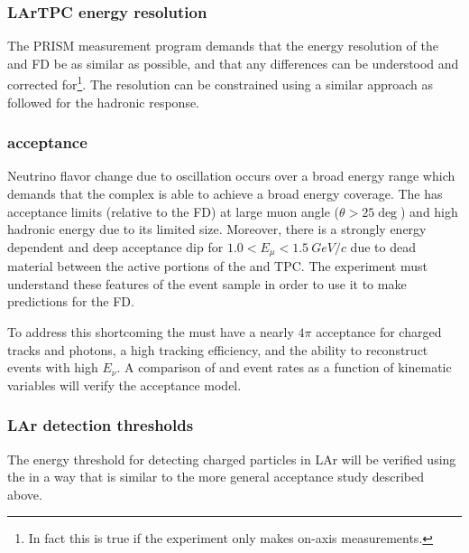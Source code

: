 \subsubsection{LArTPC energy resolution}

The PRISM measurement program demands that the energy resolution of the \larnd and FD be as similar as possible, and that any differences can be understood and corrected for\footnote{In fact this is true if  the experiment only makes on-axis measurements.}. The resolution can be constrained using a similar approach as followed for the hadronic response. 


\subsubsection{\larnd acceptance}

Neutrino flavor change due to oscillation occurs over a broad energy range which demands that the   complex is able to achieve a broad energy coverage. The \larnd has acceptance limits (relative to the FD) at large muon angle ($\theta > 25\deg$) and high hadronic energy due to its limited size. Moreover, there is a strongly energy dependent and deep acceptance dip for $1.0 < E_\mu < 1.5~GeV/c$ due to dead material between the  active portions of the \larnd and  TPC. The experiment must understand these features of the \larnd event sample in order to use it to make predictions for the FD. 

To address this shortcoming the  must have a nearly $4\pi$ acceptance for charged tracks and photons, a high tracking efficiency, and the ability to reconstruct events with high $E_\nu$. A comparison of  and \larnd event rates as a function of kinematic variables will verify the \larnd acceptance model. 



\subsubsection{LAr detection thresholds}

The energy threshold for detecting charged particles in LAr will be verified using the  in a way that is similar to the more general \larnd acceptance study described above. 

